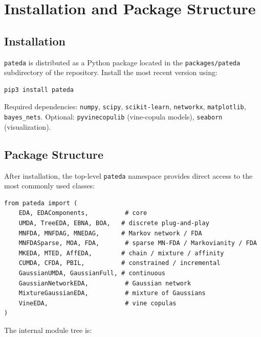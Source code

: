 \documentclass[a4paper,11pt]{article}
\begin{document}
\section{Installation and Package Structure}
\label{sec:install}

\subsection{Installation}

\texttt{pateda} is distributed as a Python package located in the \texttt{packages/pateda} subdirectory of the repository.  Install the most recent version using:

\begin{lstlisting}[language=bash]
pip3 install pateda
\end{lstlisting}

\noindent Required dependencies: \texttt{numpy}, \texttt{scipy},
\texttt{scikit-learn}, \texttt{networkx}, \texttt{matplotlib},  \texttt{bayes\_nets}.
Optional: \texttt{pyvinecopulib} (vine-copula models),  \texttt{seaborn} (visualization).

\subsection{Package Structure}

After installation, the top-level \texttt{pateda} namespace provides direct access to the most commonly used classes:

\begin{lstlisting}
from pateda import (
    EDA, EDAComponents,          # core
    UMDA, TreeEDA, EBNA, BOA,   # discrete plug-and-play
    MNFDA, MNFDAG, MNEDAG,      # Markov network / FDA
    MNFDASparse, MOA, FDA,       # sparse MN-FDA / Markovianity / FDA
    MKEDA, MTED, AffEDA,        # chain / mixture / affinity
    CUMDA, CFDA, PBIL,          # constrained / incremental
    GaussianUMDA, GaussianFull, # continuous
    GaussianNetworkEDA,          # Gaussian network
    MixtureGaussianEDA,          # mixture of Gaussians
    VineEDA,                     # vine copulas
)
\end{lstlisting}

The internal module tree is:
\end{document}
